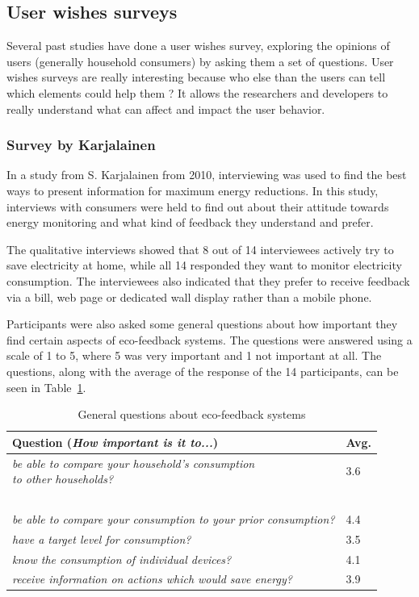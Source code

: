 \documentclass[journal]{vgtc}                %
\begin{document}
\subsection{User wishes surveys}
Several past studies have done a user wishes survey, exploring the opinions of users (generally household consumers) by asking them a set of questions. 
User wishes surveys are really interesting because who else than the users can tell which elements could help them ? It allows the researchers and developers to really understand what can affect and impact the user behavior.

\subsubsection{Survey by Karjalainen}
In a study from S. Karjalainen \cite{karjalainen2011consumer} from 2010, interviewing was used to find the best ways to present information for maximum energy reductions. In this study, interviews with consumers were held to find out about their attitude towards energy monitoring and what kind of feedback they understand and prefer.

The qualitative interviews showed that 8 out of 14 interviewees actively try to save electricity at home, while all 14 responded they want to monitor electricity consumption. The interviewees also indicated that they prefer to receive feedback via a bill, web page or dedicated wall display rather than a mobile phone.

Participants were also asked some general questions about how important they find certain aspects of eco-feedback systems. The questions were answered using a scale of 1 to 5, where 5 was very important and 1 not important at all. The questions, along with the average of the response of the 14 participants, can be seen in Table~\ref{prototypesquestions}.

\begin{table}
  \caption{General questions about eco-feedback systems  \cite{karjalainen2011consumer}}
  \label{prototypesquestions}
  \scriptsize
  \begin{center}
    \begin{tabular}{|ll|}
    \hline
       Question (\textit{How important is it to...}) & Avg. \\ \hline
       \pbox{20cm}{\textit{be able to compare your household's consumption}\\\textit{to other households?}} & 3.6 \\ ~\\[-0.25cm]
       \textit{be able to compare your consumption to your prior consumption?} & 4.4 \\ 
       \textit{have a target level for consumption?} & 3.5 \\ 
       \textit{know the consumption of individual devices?} & 4.1 \\ 
       \textit{receive information on actions which would save energy?} & 3.9 \\
       \hline
    \end{tabular}
  \end{center}
\end{table}
\end{document}
